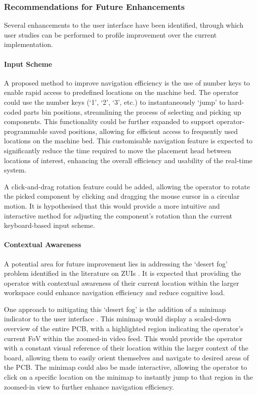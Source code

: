 \documentclass[12pt,british,UKenglish]{article}
\begin{document}
\subsubsection{Recommendations for Future Enhancements}\label{sec:Future-Enhancements}

Several enhancements to the user interface have been identified, through which user studies can be performed to profile improvement over the current implementation.

\paragraph{Input Scheme}

A proposed method to improve navigation efficiency is the use of number keys to enable rapid access to predefined locations on the machine bed.
The operator could use the number keys (`1', `2', `3', etc.) to instantaneously `jump' to hard-coded parts bin positions, streamlining the process of selecting and picking up components.
This functionality could be further expanded to support operator-programmable saved positions, allowing for efficient access to frequently used locations on the machine bed.
This customisable navigation feature is expected to significantly reduce the time required to move the placement head between locations of interest, enhancing the overall efficiency and usability of the real-time system.

A click-and-drag rotation feature could be added, allowing the operator to rotate the picked component by clicking and dragging the mouse cursor in a circular motion.
It is hypothesised that this would provide a more intuitive and interactive method for adjusting the component's rotation than the current keyboard-based input scheme.

\paragraph{Contextual Awareness}

A potential area for future improvement lies in addressing the `desert fog' problem identified in the literature on \acfp{ZUI} \cite{10.1145/288392.288578}.
It is expected that providing the operator with contextual awareness of their current location within the larger workspace could enhance navigation efficiency and reduce cognitive load.

One approach to mitigating this `desert fog' is the addition of a minimap indicator to the user interface \cite{10.1145/586081.586086}.
This minimap would display a scaled-down overview of the entire \ac{PCB}, with a highlighted region indicating the operator's current \ac{FoV} within the zoomed-in video feed.
This would provide the operator with a constant visual reference of their location within the larger context of the board, allowing them to easily orient themselves and navigate to desired areas of the \ac{PCB}.
The minimap could also be made interactive, allowing the operator to click on a specific location on the minimap to instantly jump to that region in the zoomed-in view to further enhance navigation efficiency.
\end{document}
